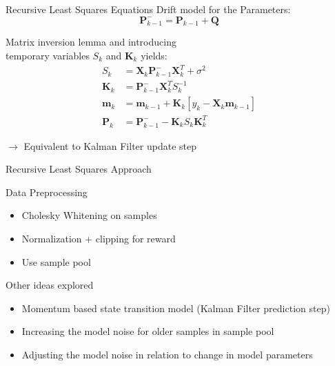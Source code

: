 \documentclass[navbarinfooter, 12pt]{sdqbeamer}
\begin{document}
\begin{frame}{Recursive Least Squares Equations}
  Drift model for the Parameters:
  $$ \textbf{P}^-_{k-1} = \textbf{P}_{k-1} + \textbf{Q} $$
  
  Matrix inversion lemma and introducing \\
  temporary variables $S_k$ and $\textbf{K}_k$ yields:
   \begin{align*}
     S_k &= \textbf{X}_k \textbf{P}^-_{k-1} \textbf{X}^T_k + \sigma^2 \\
     \textbf{K}_k &= \textbf{P}^-_{k-1} \textbf{X}^T_k S_k^{-1} \\
     \textbf{m}_k &= \textbf{m}_{k-1} + \textbf{K}_k [y_k - \textbf{X}_k \textbf{m}_{k-1}] \\
     \textbf{P}_k &= \textbf{P}^-_{k-1} - \textbf{K}_k S_k \textbf{K}_k^T
   \end{align*}

   $\rightarrow$ Equivalent to Kalman Filter update step
\end{frame}


\begin{frame}{Recursive Least Squares Approach}
  \begin{block}{Data Preprocessing}
    \begin{itemize}
    \item Cholesky Whitening on samples
    \item Normalization + clipping for reward
    \item Use sample pool
    \end{itemize}
  \end{block}
  \begin{block}{Other ideas explored}
  \begin{itemize}
  \item Momentum based state transition model (Kalman Filter prediction step)
  \item Increasing the model noise for older samples in sample pool
  \item Adjusting the model noise in relation to change in model parameters
  \end{itemize}    
  \end{block}
\end{frame}
\end{document}
